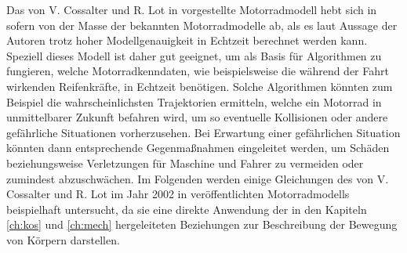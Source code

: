 Das von V. Cossalter und R. Lot in \cite{Cossalter2002} vorgestellte Motorradmodell hebt sich in sofern von der Masse der bekannten Motorradmodelle ab, als es laut Aussage der Autoren trotz hoher Modellgenauigkeit in Echtzeit berechnet werden kann. Speziell dieses Modell ist daher gut geeignet, um als Basis f\"ur Algorithmen zu fungieren, welche Motorradkenndaten, wie beispielsweise die w\"ahrend der Fahrt wirkenden Reifenkr\"afte, in Echtzeit ben\"otigen. Solche Algorithmen k\"onnten zum Beispiel die wahrscheinlichsten Trajektorien ermitteln, welche ein Motorrad in unmittelbarer Zukunft befahren wird, um so eventuelle Kollisionen oder andere gef\"ahrliche Situationen vorherzusehen. Bei Erwartung einer gef\"ahrlichen Situation k\"onnten dann entsprechende Gegenma\ss{}nahmen eingeleitet werden, um Sch\"aden beziehungsweise Verletzungen f\"ur Maschine und Fahrer zu vermeiden oder zumindest abzuschw\"achen. \hfill \newline
Im Folgenden werden einige Gleichungen des von V. Cossalter und R. Lot im Jahr 2002 in \cite{Cossalter2002} ver\"offentlichten Motorradmodells beispielhaft untersucht, da sie eine direkte Anwendung der in den Kapiteln \ref{ch:kos} und \ref{ch:mech} hergeleiteten Beziehungen zur Beschreibung der Bewegung von K\"orpern darstellen. 

